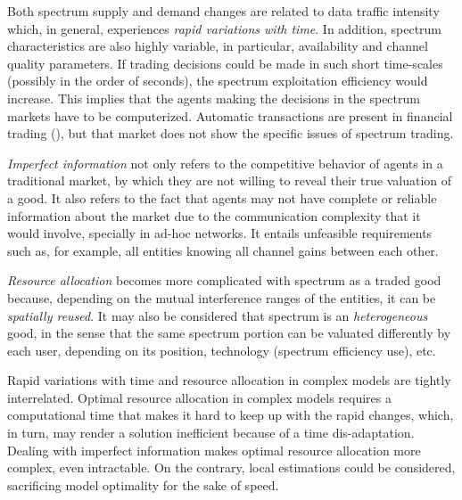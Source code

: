 Both spectrum supply and demand changes are related to data traffic intensity which, in general, experiences \textit{rapid variations with time}. 
In addition, spectrum characteristics are also highly variable, in particular, availability and channel quality parameters. If trading decisions could be made in such short time-scales (possibly in the order of seconds), the spectrum exploitation efficiency would increase. This implies that the agents making the decisions in the spectrum markets have to be computerized. Automatic transactions are present in financial trading (\cite{ref:Adler2012}), but that market does not show the specific issues of spectrum trading. 

\textit{Imperfect information} not only refers to the competitive behavior of agents in a traditional market, by which they are not willing to reveal their true valuation of a good. 
It also refers to the fact that agents may not have complete or reliable information about the market due to the communication complexity that it would involve, specially in ad-hoc networks. 
It entails unfeasible requirements such as, for example, all entities knowing all channel gains between each other.

\textit{Resource allocation} becomes more complicated with spectrum as a traded good because, depending on the mutual interference ranges of the entities, it can be \textit{spatially reused}. 
It may also be considered that spectrum is an \textit{heterogeneous} good, in the sense that the same spectrum portion can be valuated differently by each user, depending on its position, technology (spectrum efficiency use), etc. 

Rapid variations with time and resource allocation in complex models are tightly interrelated.
Optimal resource allocation in complex models requires a computational time that makes it hard to keep up with the rapid changes, which, in turn, may render a solution inefficient because of a time dis-adaptation. 
Dealing with imperfect information makes optimal resource allocation more complex, even intractable. On the contrary, local estimations could be considered, sacrificing model optimality for the sake of speed.

